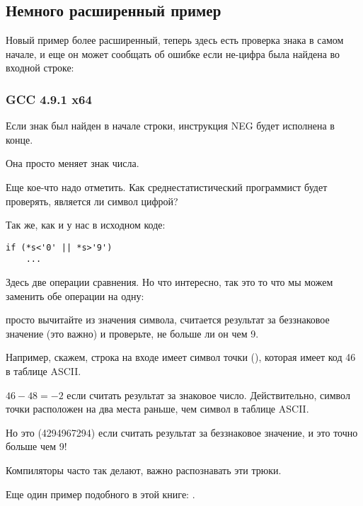 \subsection{Немного расширенный пример}

Новый пример более расширенный, теперь здесь есть проверка знака  в самом начале,
и еще он может сообщать об ошибке если не-цифра была найдена во входной строке:



\subsubsection{\Optimizing GCC 4.9.1 x64}



Если знак  был найден в начале строки, инструкция NEG будет исполнена в конце.

Она просто меняет знак числа.

\label{one_comparison_instead_of_two}
Еще кое-что надо отметить.
Как среднестатистический программист будет проверять, является ли символ цифрой?

Так же, как и у нас в исходном коде:

\begin{lstlisting}
if (*s<'0' || *s>'9')
    ...
\end{lstlisting}

Здесь две операции сравнения.
Но что интересно, так это то что мы можем заменить обе операции на одну:

просто вычитайте  из значения символа,
считается результат за беззнаковое значение (это важно) и проверьте, не больше ли он чем 9.

Например, скажем, строка на входе имеет символ точки (), которая имеет код 46 в таблице \ac{ASCII}.

$46-48=-2$ если считать результат за знаковое число.
Действительно, символ точки расположен на два места раньше, чем символ  в таблице \ac{ASCII}.

Но это  (4294967294) если считать результат за беззнаковое значение, 
и это точно больше чем 9!

Компиляторы часто так делают, важно распознавать эти трюки.

Еще один пример подобного в этой книге: 
.

